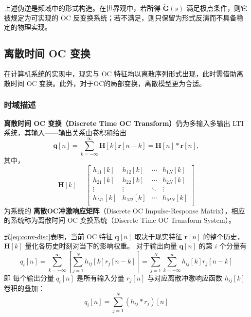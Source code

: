 \begin{remark}
    上述伪逆是频域中的形式构造。在\wkn{}世界观中，若所得 $\tilde{\mathbf{G}}(s)$ 满足极点条件，则它被规定为可实现的 OC 反变换系统；若不满足，则只保留为形式反演而不具备稳定的物理实现。
\end{remark}

\subsection{离散时间 OC 变换}

在计算机系统的实现中，现实与 OC 特征均以离散序列形式出现，此时需借助离散时间 OC 变换。此外，对于OC的局部变换，离散模型更为合适。

\subsubsection{时域描述}

\begin{theorem}
    \textbf{离散时间 OC 变换（Discrete Time OC Transform）}仍为多输入多输出 LTI 系统，其输入——输出关系由卷积和给出
    \begin{equation}
        \mathbf{q}[n]=\sum_{k=-\infty}^{\infty}\mathbf{H}[k]\mathbf{r}[n-k]=\mathbf{H}[n]*\mathbf{r}[n],
        \label{eq:conv-disc}
    \end{equation}
    其中，
    \begin{equation}
        \mathbf{H}[k] = \begin{bmatrix}
            h_{11}[k] & h_{12}[k] & \cdots & h_{1N}[k] \\
            h_{21}[k] & h_{22}[k] & \cdots & h_{2N}[k] \\
            \vdots    & \vdots    & \ddots & \vdots    \\
            h_{M1}[k] & h_{M2}[k] & \cdots & h_{MN}[k] \\
        \end{bmatrix}
    \end{equation}
    为系统的 \textbf{离散OC冲激响应矩阵}（Discrete OC Impulse-Response Matrix），相应的系统称为离散时间 OC 变换系统（Discrete Time OC Transform System）。
\end{theorem}

\begin{remark}
    式\eqref{eq:conv-disc}表明，当前 OC 特征 $\mathbf{q}[n]$ 取决于现实特征 $\mathbf{r}[n]$ 的整个历史，$\mathbf{H}[k]$ 量化各历史时刻对当下的影响权重。
    对于输出向量 \(\mathbf{q}[n]\) 的第 \(i\) 个分量有
    \begin{equation}
        q_i[n] = \sum_{k=-\infty}^{\infty} \left[ \sum_{j=1}^{N} h_{ij}[k] r_j[n-k] \right]
        = \sum_{j=1}^{N} \sum_{k=-\infty}^{\infty} h_{ij}[k] r_j[n-k]
    \end{equation}
    即
    每个输出分量 \(q_i[n]\) 是所有输入分量 \(r_j[n]\) 与对应离散冲激响应函数 \(h_{ij}[k]\) 卷积的叠加：
    \begin{equation}
        q_i[n] = \sum_{j=1}^{N} (h_{ij} * r_j)[n]
    \end{equation}
\end{remark}

